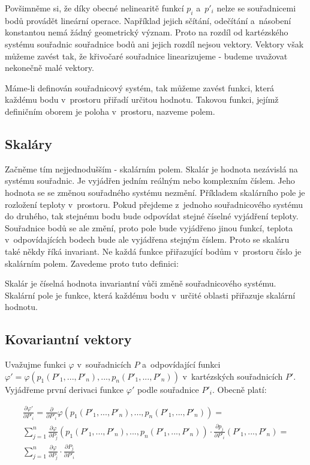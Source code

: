 Povšimněme si, že díky obecné nelinearitě funkcí \(p_i\) a~\(p'_i\) nelze se souřadnicemi bodů provádět lineární operace. Například jejich sčítání, odečítání a~násobení konstantou nemá žádný geometrický význam. Proto na rozdíl od kartézského systému souřadnic souřadnice bodů ani jejich rozdíl nejsou vektory. Vektory však můžeme zavést tak, že křivočaré souřadnice linearizujeme - budeme uvažovat nekonečně malé vektory.

Máme-li definován souřadnicový systém, tak můžeme zavést funkci, která každému bodu v~prostoru přiřadí určitou hodnotu. Takovou funkci, jejímž definičním oborem je poloha v~prostoru, nazveme polem. 

\subsection{Skaláry}

Začněme tím nejjednodušším - skalárním polem. Skalár je hodnota nezávislá na systému souřadnic. Je vyjádřen jedním reálným nebo komplexním číslem. Jeho hodnota se se změnou souřadného systému nezmění. Příkladem skalárního pole je rozložení teploty v~prostoru. Pokud přejdeme z~jednoho souřadnicového systému do druhého, tak stejnému bodu bude odpovídat stejné číselné vyjádření teploty. Souřadnice bodů se ale změní, proto pole bude vyjádřeno jinou funkcí, teplota v~odpovídajících bodech bude ale vyjádřena stejným číslem. Proto se skaláru také někdy říká invariant. Ne každá funkce přiřazující bodům v~prostoru číslo je skalárním polem. Zavedeme proto tuto definici:

\begin{fact}
Skalár je číselná hodnota invariantní vůči změně souřadnicového systému. Skalární pole je funkce, která každému bodu v~určité oblasti přiřazuje skalární hodnotu.
\end{fact}

\subsection{Kovariantní vektory}

Uvažujme funkci \(\varphi\) v~souřadnicích \(P\) a~odpovídající funkci \(\varphi' = \varphi(p_1(P'_1, ..., P'_n), ..., p_n(P'_1, ..., P'_n))\) v~kartézských souřadnicích \(P'\). Vyjádřeme první derivaci funkce \(\varphi'\) podle souřadnice \(P'_i\). Obecně platí:

\begin{equation}
\begin{split}
\frac{\partial \varphi'}{\partial P'_i} = \frac{\partial}{\partial P'_i} \varphi (p_1(P'_1, ..., P'_n), ..., p_n(P'_1, ..., P'_n)) = \\
\sum_{j=1}^n \frac{\partial \varphi}{\partial P_j} (p_1(P'_1, ..., P'_n), ..., p_n(P'_1, ..., P'_n)) \cdot \frac{\partial p_j}{\partial P'_i} (P'_1, ..., P'_n) = \\
\sum_{j=1}^n \frac{\partial \varphi}{\partial P_j} \cdot \frac{\partial P_j}{\partial P'_i}
\end{split}
\end{equation}

